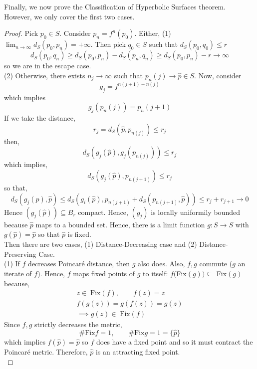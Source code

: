 \documentclass[a4paper, 11pt]{book}
\theoremstyle{definition}
\theoremstyle{remark}
\begin{document}
    Finally, we now prove the Classification of Hyperbolic Surfaces theorem. However, we only cover the first two cases.

    \begin{proof}
        Pick $p_0\in S$. Consider $p_n = f^n(p_0)$. Either, (1)
        $\lim_{n\to\infty} d_S(p_0,p_n) = +\infty$. Then pick $q_0\in S$ such that $d_S(p_0,q_0)\leq r$
        \[ d_S(p_0,q_n)\geq d_S(p_0,p_n)-d_S(p_n,q_n) \geq d_S(p_0,p_n) -r \to \infty \]
        so we are in the escape case.\\

        (2) Otherwise, there exists $n_j\to\infty$ such that $p_n(j)\to\hat{p}\in S$. Now, consider
        \[ g_j = f^{n(j+1)-n(j)} \]
        which implies
        \[ g_j(p_n(j)) = p_n(j+1) \]
        If we take the distance,
        \[ r_j = d_S(\hat{p},p_{n(j)})\leq r_j \]
        then,
        \[ d_S(g_j(\hat{p}),g_j(p_{n(j)})) \leq r_j \]
        which implies,
        \[ d_S(g_j(\hat{p}),p_{n(j+1)})\leq r_j \]
        so that,
        \[ d_S(g_j(\hat{p}),\hat{p}) \leq d_S(g_i(\hat{p}),p_{n(j+1)}+d_S(p_{n(j+1)},\hat{p})) \leq r_j + r_{j+1} \to 0 \]
        Hence $(g_j(\hat{p}))\subseteq B_r$ compact. Hence, $(g_j)$ is locally uniformily bounded because $\hat{p}$ maps to a
        bounded set. Hence, there is a limit function $g:S\to S$ with $g(\hat{p}) = \hat{p}$ so that $\hat{p}$ is fixed.\\

        Then there are two cases, (1) Distance-Decreasing case and (2) Distance-Preserving Case.\\

        (1) If $f$ decreases Poincaré distance, then $g$ also does. Also, $f,g$ commute ($g$ an iterate of $f$). Hence,
        $f$ maps fixed points of $g$ to itself: $f($Fix$(g))\subseteq$ Fix$(g)$ because,
        \begin{align*}
            z\in\;\text{Fix}(f),\qquad f(z) = z \\
            f(g(z)) = g(f(z)) = g(z) \\
            \implies g(z) \in\;\text{Fix}(f)
        \end{align*}
        Since $f,g$ strictly decreases the metric,
        \[ \#\text{Fix}f = 1,\qquad \#\text{Fix}g = 1 = \{\hat{p}\} \]
        which implies $f(\hat{p}) = \hat{p}$ so $f$ does have a fixed point and so it must contract the Poincaré metric.
        Therefore, $\hat{p}$ is an attracting fixed point.\\


\end{proof}
\end{document}
